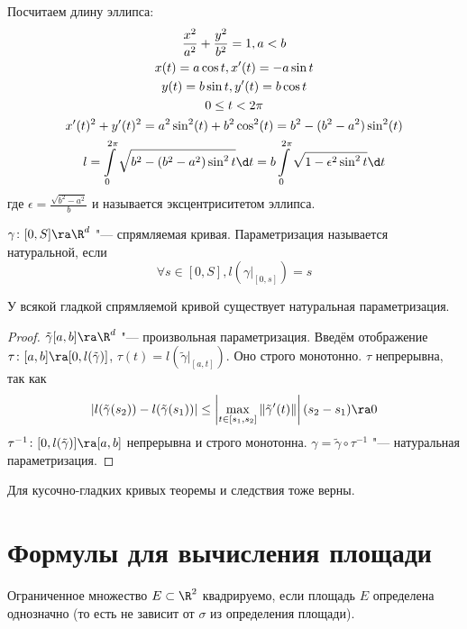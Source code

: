 \begin{exmp}
	Посчитаем длину эллипса:
	\begin{gather*}
		\frac{x^2}{a^2} + \frac{y^2}{b^2} = 1, a < b \\
		x(t) = a\cos t, x'(t) = -a\sin t \\
		y(t) = b\sin t, y'(t) = b\cos t \\
		0 \le t < 2\pi \\
		x'(t)^2 + y'(t)^2 = a^2\sin^2(t) + b^2\cos^2(t) = b^2 - (b^2 - a^2)\sin^2(t) \\
		l = \int\limits_0^{2\pi} \sqrt{b^2 - (b^2 - a^2)\sin^2t} \d t = b\int\limits_0^{2\pi}\sqrt{1 - \epsilon^2\sin^2t}\d t
	\end{gather*}
	где $\epsilon = \frac{\sqrt{b^2-a^2}}{b}$ и называется эксцентриситетом эллипса.
\end{exmp}

\begin{Def}
	$\gamma \colon [0, S] \ra \R^d$ "--- спрямляемая кривая.
	Параметризация называется натуральной, если
	\[ \forall s \in [0, S], l\left(\gamma\bigr|_{[0, s]}\right) = s \]
\end{Def}

\begin{theorem}
	У всякой гладкой спрямляемой кривой существует натуральная параметризация.
\end{theorem}
\begin{proof}
	$\tilde \gamma[a, b] \ra \R^d$ "--- произвольная параметризация.
	Введём отображение $\tau \colon [a, b] \ra [0, l(\tilde \gamma)]$, $\tau(t) = l(\tilde \gamma|_{[a, t]})$.
	Оно строго монотонно.
	$\tau$ непрерывна, так как
	\[ |l(\tilde \gamma(s_2)) - l(\tilde \gamma(s_1))| \le \left|\max\limits_{t \in [s_1,s_2]}\|\tilde \gamma'(t)\|\right|(s_2 - s_1) \ra 0 \]
	$\tau^{-1} \colon [0, l(\tilde \gamma)] \ra [a, b]$ непрерывна и строго монотонна.
	$\gamma = \tilde \gamma \circ \tau^{-1}$ "--- натуральная параметризация.
\end{proof}

\begin{Rem}
	Для кусочно-гладких кривых теоремы и следствия тоже верны.
\end{Rem}

\section {Формулы для вычисления площади}

\begin{Def}
	Ограниченное множество $E \subset \R^2$ квадрируемо, если площадь $E$ определена однозначно (то есть не зависит от $\sigma$ из определения площади).
\end{Def}

